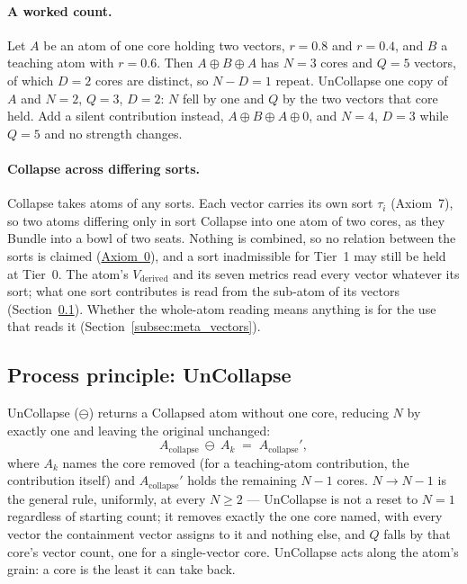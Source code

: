 \documentclass[12pt, a4paper]{article}
\begin{document}
\paragraph{A worked count.} Let $A$ be an atom of one core holding two
vectors, $r=0.8$ and $r=0.4$, and $B$ a teaching atom with $r=0.6$.
Then $A\oplus B\oplus A$ has $N=3$ cores and $Q=5$ vectors, of which
$D=2$ cores are distinct, so $N-D=1$ repeat. UnCollapse one copy of
$A$ and $N=2$, $Q=3$, $D=2$: $N$ fell by one and $Q$ by the two
vectors that core held. Add a silent contribution instead,
$A\oplus B\oplus A\oplus 0$, and $N=4$, $D=3$ while $Q=5$ and no
strength changes.

\paragraph{Collapse across differing sorts.} Collapse takes atoms of any sorts. Each vector carries its own sort $\tau_i$ (Axiom~7), so two atoms differing only in sort Collapse into one atom of two cores, as they Bundle into a bowl of two seats. Nothing is combined, so no relation between the sorts is claimed (\hyperref[subsec:axiom0_admissibility]{Axiom~0}), and a sort inadmissible for Tier~1 may still be held at Tier~0. The atom's $V_{\text{derived}}$ and its seven metrics read every vector whatever its sort; what one sort contributes is read from the sub-atom of its vectors (Section~\ref{subsec:process_principle_uncollapse}). Whether the whole-atom reading means anything is for the use that reads it (Section~\ref{subsec:meta_vectors}).

\subsection{Process principle: UnCollapse}
\label{subsec:process_principle_uncollapse}

UnCollapse ($\ominus$) returns a Collapsed atom without one core,
reducing $N$ by exactly one and leaving the original unchanged:
\[
A_{\text{collapse}}\ \ominus\ A_k \;=\; A_{\text{collapse}}',
\]
where $A_k$ names the core removed (for a teaching-atom contribution,
the contribution itself) and $A_{\text{collapse}}'$ holds the remaining
$N-1$ cores. $N\to N-1$ is the general rule, uniformly, at every
$N\ge2$ --- UnCollapse is not a reset to $N=1$ regardless of starting
count; it removes exactly the one core named, with every vector the containment vector assigns to it and nothing else, and $Q$ falls by that core's vector count, one for a single-vector core. UnCollapse acts along the atom's grain: a core is the least it can take back.
\end{document}
